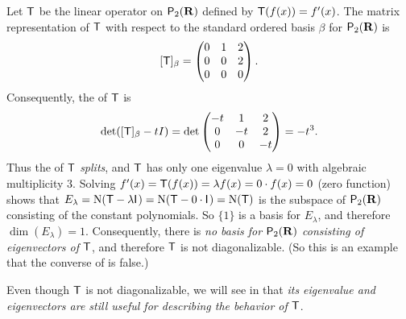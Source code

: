 \begin{example} \label{example 5.2.3}
Let \(\textsf{T}\) be the linear operator on \(\textsf{P}_2(\mathbf{R})\) defined by \(\textsf{T}(f(x)) = f'(x)\).
The matrix representation of \(\textsf{T}\) with respect to the standard ordered basis \(\beta\) for \(\textsf{P}_2(\mathbf{R})\) is
\[
    [\textsf{T}]_{\beta} = \begin{pmatrix} 0 & 1 & 2 \\ 0 & 0 & 2 \\ 0 & 0 & 0 \end{pmatrix}.
\]
Consequently, the \CPOLY{} of \(\textsf{T}\) is
\[
    \det([\textsf{T}]_{\beta} - tI) = \det \begin{pmatrix} -t & 1 & 2 \\ 0 & -t & 2 \\ 0 & 0 & -t \end{pmatrix} = -t^3.
\]
Thus the \CPOLY{} of \(\textsf{T}\) \emph{splits}, and \(\textsf{T}\) has only one eigenvalue \(\lambda = 0\) with algebraic multiplicity \(3\).
Solving \(f'(x) = \textsf{T}(f(x)) = \lambda f(x) = 0 \cdot f(x) = 0\) (zero function) shows that \(E_{\lambda} = \mathrm{N}(\textsf{T} - \lambda \textsf{I}_{_{}}) = \mathrm{N}(\textsf{T} - 0 \cdot \textsf{I}_{_{}}) = \mathrm{N}(\textsf{T})\) is the subspace of \(\textsf{P}_2(\mathbf{R})\) consisting of the constant polynomials.
So \(\{ 1 \}\) is a basis for \(E_{\lambda}\), and therefore \(\dim(E_{\lambda}) = 1\).
Consequently, there is \emph{no basis for \(\textsf{P}_2(\mathbf{R})\) consisting of eigenvectors of \(\textsf{T}\)}, and therefore \(\textsf{T}\) is not diagonalizable.
(So this is an example that the converse of  is false.)
\end{example}

\begin{remark} \label{remark 5.2.5}
Even though \(\textsf{T}\) is not diagonalizable, we will see in  that \emph{its eigenvalue and eigenvectors are still useful for describing the behavior of \(\textsf{T}\)}.
\end{remark}

